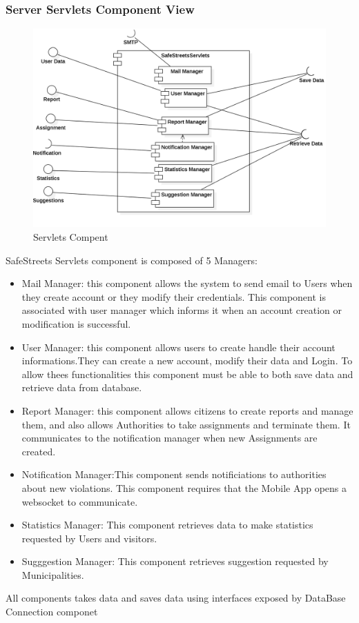 \subsubsection{Server Servlets Component View}
\begin{figure}[H]
\centering
\includegraphics[width=\textwidth]{Images/ServletsComponent.png}
\caption{\label{fig:ComWI} Servlets Compent }
\end{figure}
 SafeStreets Servlets component is composed of 5 Managers:
\begin{itemize}
\item Mail Manager: this component allows the system to send email to Users when they create account or they modify their credentials. This component is associated with user manager which informs it when an account creation or modification is successful.
\item User Manager: this component allows users to create handle their account informations.They can create a new account, modify their data and Login. To allow thees functionalities this component must be able to both save data and retrieve data from database.
\item Report Manager: this component allows citizens to create reports and manage them, and also allows Authorities to take assignments and terminate them. It communicates to the notification manager when new Assignments are created.
\item Notification Manager:This component sends notificiations to authorities about new violations. This component requires that the Mobile App opens a websocket to communicate. 
\item Statistics Manager: This component retrieves data to make  statistics requested by Users and visitors.
\item Sugggestion Manager: This component retrieves suggestion requested by Municipalities.
\end{itemize}
All components takes data and saves data using interfaces exposed by DataBase Connection componet
